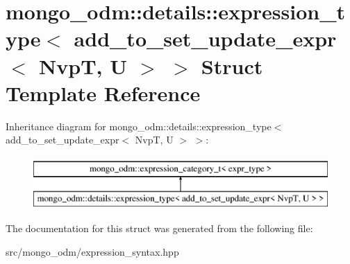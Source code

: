 \hypertarget{structmongo__odm_1_1details_1_1expression__type_3_01add__to__set__update__expr_3_01NvpT_00_01U_01_4_01_4}{}\section{mongo\+\_\+odm\+:\+:details\+:\+:expression\+\_\+type$<$ add\+\_\+to\+\_\+set\+\_\+update\+\_\+expr$<$ NvpT, U $>$ $>$ Struct Template Reference}
\label{structmongo__odm_1_1details_1_1expression__type_3_01add__to__set__update__expr_3_01NvpT_00_01U_01_4_01_4}
Inheritance diagram for mongo\+\_\+odm\+:\+:details\+:\+:expression\+\_\+type$<$ add\+\_\+to\+\_\+set\+\_\+update\+\_\+expr$<$ NvpT, U $>$ $>$\+:\begin{figure}[H]
\begin{center}
\leavevmode
\includegraphics[height=2.000000cm]{structmongo__odm_1_1details_1_1expression__type_3_01add__to__set__update__expr_3_01NvpT_00_01U_01_4_01_4}
\end{center}
\end{figure}


The documentation for this struct was generated from the following file\+:\begin{DoxyCompactItemize}
\item 
src/mongo\+\_\+odm/expression\+\_\+syntax.\+hpp\end{DoxyCompactItemize}
